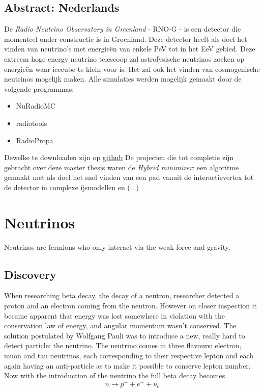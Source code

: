 \documentclass[11pt,a4paper,faculty=we,language=en,doctype=report]{cls/ugent-doc}
\begin{document}
\section{Abstract: Nederlands}
De \textit{Radio Neutrino Observatory in Greenland} - RNO-G - is een detector die momenteel onder constructie is
in Groenland. Deze detector heeft als doel het vinden van neutrino's met energieën van enkele PeV
tot in het EeV gebied. Deze extreem hoge energy neutrino telescoop zal astrofysische neutrinos
zoeken op energieën waar icecube te klein voor is. Het zal ook het vinden van cosmogenische
neutrinos mogelijk maken.
Alle simulaties werden mogelijk gemaakt door de volgende programmas:
\begin{itemize}
	\item NuRadioMC
	\item radiotools
	\item RadioPropa
\end{itemize}
Dewelke te downloaden zijn op \href{https://github.com/nu-radio}{github}
De projecten die tot completie zijn gebracht over deze master thesis waren de
\textit{Hybrid minimizer}: een algoritme gemaakt met als doel het snel vinden van
een pad vanuit de interactievertex tot de detector in complexe ijsmodellen en
(...)
\chapter{Neutrinos}
Neutrinos are fermions who only interact
via the weak force and gravity.
\section{Discovery}
When researching beta decay, the decay of a neutron, researcher
detected a proton and an electron coming from the neutron. However
on closer inspection it became apparent that energy was lost
somewhere in violation with the conservation law of energy, and
angular momentum wasn't conserved.  The solution postulated by
Wolfgang Pauli was to introduce a new, really hard to detect
particle: the neutrino.  The neutrino comes in three flavours:
electron, muon and tau neutrinos, each corresponding to their
respective lepton 
and each again having an anti-particle as to make it possible to conserve lepton number.
Now with the introduction of the neutrino the full beta decay
becomes
\begin{equation}
	n \rightarrow p^+ + e^- + \nu_e
\end{equation}
\end{document}
